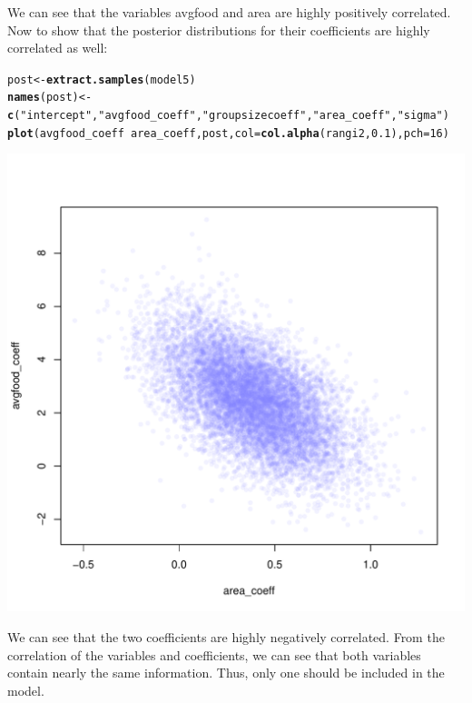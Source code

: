 \documentclass[12pt]{article}\usepackage[]{graphicx}\usepackage[]{color}
\makeatletter
\def\maxwidth{ %
  \ifdim\Gin@nat@width>\linewidth
    \linewidth
  \else
    \Gin@nat@width
  \fi
}
\newcommand{\hlnum}[1]{\textcolor[rgb]{0.686,0.059,0.569}{#1}}%
\newcommand{\hlstr}[1]{\textcolor[rgb]{0.192,0.494,0.8}{#1}}%
\newcommand{\hlopt}[1]{\textcolor[rgb]{0,0,0}{#1}}%
\newcommand{\hlstd}[1]{\textcolor[rgb]{0.345,0.345,0.345}{#1}}%
\newcommand{\hlkwb}[1]{\textcolor[rgb]{0.69,0.353,0.396}{#1}}%
\newcommand{\hlkwc}[1]{\textcolor[rgb]{0.333,0.667,0.333}{#1}}%
\newcommand{\hlkwd}[1]{\textcolor[rgb]{0.737,0.353,0.396}{\textbf{#1}}}%
\newenvironment{kframe}{%
 \def\at@end@of@kframe{}%
 \ifinner\ifhmode%
  \def\at@end@of@kframe{\end{minipage}}%
  \begin{minipage}{\columnwidth}%
 \fi\fi%
 \def\FrameCommand##1{\hskip\@totalleftmargin \hskip-\fboxsep
 \colorbox{shadecolor}{##1}\hskip-\fboxsep
     \hskip-\linewidth \hskip-\@totalleftmargin \hskip\columnwidth}%
 \MakeFramed {\advance\hsize-\width
   \@totalleftmargin\z@ \linewidth\hsize
   \@setminipage}}%
 {\par\unskip\endMakeFramed%
 \at@end@of@kframe}
\newenvironment{knitrout}{}{} %
\makeatother
\begin{document}
We can see that the variables avgfood and area are highly positively correlated. Now to show that the posterior distributions for their coefficients are highly correlated as well:

\begin{knitrout}
\color{fgcolor}\begin{kframe}
\begin{alltt}
\hlstd{post} \hlkwb{<-} \hlkwd{extract.samples}\hlstd{(model5)}
\hlkwd{names}\hlstd{(post)} \hlkwb{<-} \hlkwd{c}\hlstd{(}\hlstr{"intercept"}\hlstd{,} \hlstr{"avgfood_coeff"}\hlstd{,} \hlstr{"groupsize coeff"}\hlstd{,} \hlstr{"area_coeff"}\hlstd{,} \hlstr{"sigma"}\hlstd{)}
\hlkwd{plot}\hlstd{(avgfood_coeff} \hlopt{~} \hlstd{area_coeff, post,} \hlkwc{col}\hlstd{=}\hlkwd{col.alpha}\hlstd{(rangi2,} \hlnum{0.1}\hlstd{),} \hlkwc{pch} \hlstd{=} \hlnum{16}\hlstd{)}
\end{alltt}
\end{kframe}
\includegraphics[width=\maxwidth]{figure/unnamed-chunk-10-1} 

\end{knitrout}

We can see that the two coefficients are highly negatively correlated. From the correlation of the variables and coefficients, we can see that both variables contain nearly the same information. Thus, only one should be included in the model.
\end{document}
